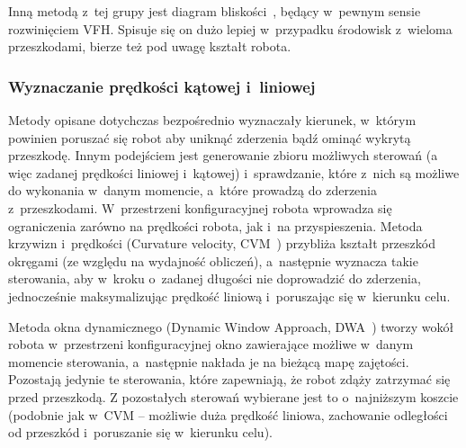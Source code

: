 Inną metodą z~tej grupy jest diagram bliskości~\cite{minguez2004nearness}, będący 
w~pewnym sensie rozwinięciem VFH.
Spisuje się on dużo lepiej w~przypadku środowisk z~wieloma przeszkodami, bierze też
pod uwagę kształt robota.

\subsubsection{Wyznaczanie prędkości kątowej i~liniowej}

Metody opisane dotychczas bezpośrednio wyznaczały kierunek, w~którym powinien poruszać
się robot aby uniknąć zderzenia bądź ominąć wykrytą przeszkodę. Innym podejściem
jest generowanie zbioru możliwych sterowań (a więc zadanej prędkości liniowej i~kątowej)
i~sprawdzanie, które z~nich są możliwe do wykonania w~danym momencie, a~które prowadzą
do zderzenia z~przeszkodami. W~przestrzeni konfiguracyjnej robota wprowadza się ograniczenia
zarówno na prędkości robota, jak i~na przyspieszenia. Metoda krzywizn i~prędkości
(Curvature velocity, CVM~\cite{511023}) przybliża kształt przeszkód okręgami (ze względu na wydajność
obliczeń), a~następnie wyznacza takie sterowania, aby w~kroku o~zadanej długości
nie doprowadzić do zderzenia, jednocześnie maksymalizując prędkość liniową i~poruszając
się w~kierunku celu.

Metoda okna dynamicznego (Dynamic Window Approach, DWA~\cite{fox1997dynamic}) tworzy wokół robota w~przestrzeni
konfiguracyjnej okno zawierające możliwe w~danym momencie sterowania, a~następnie nakłada
je na bieżącą mapę zajętości. Pozostają jedynie te sterowania, które zapewniają,
że robot zdąży zatrzymać się przed przeszkodą. Z pozostałych sterowań wybierane jest
to o~najniższym koszcie (podobnie jak w~CVM -- możliwie duża prędkość liniowa,
zachowanie odległości od przeszkód i~poruszanie się w~kierunku celu).
